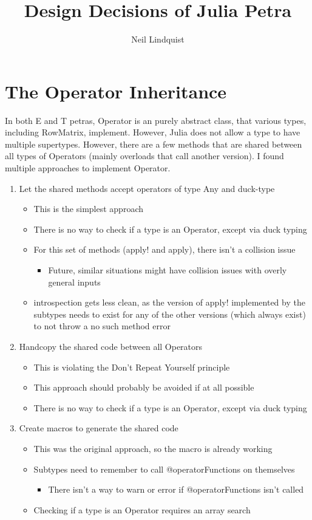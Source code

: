 \documentclass{article}
\title{Design Decisions of Julia Petra}
\author{Neil Lindquist}
\begin{document}
\section{The Operator Inheritance}
In both E and T petras, Operator is an purely abstract class, that various types, including RowMatrix, implement.  However, Julia does not allow a type to have multiple supertypes.  However, there are a few methods that are shared between all types of Operators (mainly overloads that call another version).  I found multiple approaches to implement Operator.
\begin{enumerate}
	\item Let the shared methods accept operators of type Any and duck-type
	\begin{itemize}
		\item This is the simplest approach
		\item There is no way to check if a type is an Operator, except via duck typing
		\item For this set of methods (apply! and apply), there isn't a collision issue
		\begin{itemize}
			\item Future, similar situations might have collision issues with overly general inputs
		\end{itemize}
		\item introspection gets less clean, as the version of apply! implemented by the subtypes needs to exist for any of the other versions (which always exist) to not throw a no such method error
	\end{itemize}

	\item Handcopy the shared code between all Operators
	\begin{itemize}
		\item This is violating the Don't Repeat Yourself principle
		\item This approach should probably be avoided if at all possible
		\item There is no way to check if a type is an Operator, except via duck typing
	\end{itemize}
	
	\item Create macros to generate the shared code
	\begin{itemize}
		\item This was the original approach, so the macro is already working
		\item Subtypes need to remember to call @operatorFunctions on themselves
		\begin{itemize}
			\item There isn't a way to warn or error if @operatorFunctions isn't called
		\end{itemize}
		\item Checking if a type is an Operator requires an array search
	\end{itemize}
	

\end{enumerate}
\end{document}
